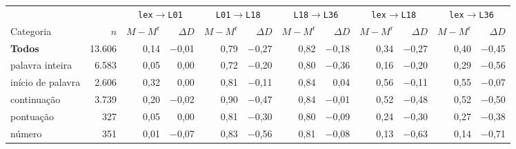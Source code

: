 \footnotesize
\setlength{\tabcolsep}{3.5pt}
\begin{tabular}{lrrrrrrrrrrr}
\toprule
 &  & \multicolumn{2}{c}{\texttt{lex$\to$L01}} & \multicolumn{2}{c}{\texttt{L01$\to$L18}} & \multicolumn{2}{c}{\texttt{L18$\to$L36}} & \multicolumn{2}{c}{\texttt{lex$\to$L18}} & \multicolumn{2}{c}{\texttt{lex$\to$L36}} \\
\cmidrule(lr){3-4}\cmidrule(lr){5-6}\cmidrule(lr){7-8}\cmidrule(lr){9-10}\cmidrule(lr){11-12}
Categoria & $n$ & $M\!-\!M^{\mathrm{r}}$ & $\Delta D$ & $M\!-\!M^{\mathrm{r}}$ & $\Delta D$ & $M\!-\!M^{\mathrm{r}}$ & $\Delta D$ & $M\!-\!M^{\mathrm{r}}$ & $\Delta D$ & $M\!-\!M^{\mathrm{r}}$ & $\Delta D$ \\
\midrule
\textbf{Todos} & 13.606 & 0,14 & $-$0,01 & 0,79 & $-$0,27 & 0,82 & $-$0,18 & 0,34 & $-$0,27 & 0,40 & $-$0,45 \\
\midrule
palavra inteira & 6.583 & 0,05 & 0,00 & 0,72 & $-$0,20 & 0,80 & $-$0,36 & 0,16 & $-$0,20 & 0,29 & $-$0,56 \\
início de palavra & 2.606 & 0,32 & 0,00 & 0,81 & $-$0,11 & 0,84 & 0,04 & 0,56 & $-$0,11 & 0,55 & $-$0,07 \\
continuação & 3.739 & 0,20 & $-$0,02 & 0,90 & $-$0,47 & 0,84 & $-$0,01 & 0,52 & $-$0,48 & 0,52 & $-$0,50 \\
pontuação & 327 & 0,05 & 0,00 & 0,81 & $-$0,30 & 0,80 & $-$0,09 & 0,24 & $-$0,30 & 0,27 & $-$0,38 \\
número & 351 & 0,01 & $-$0,07 & 0,83 & $-$0,56 & 0,81 & $-$0,08 & 0,13 & $-$0,63 & 0,14 & $-$0,71 \\
\bottomrule
\end{tabular}

\par{}

